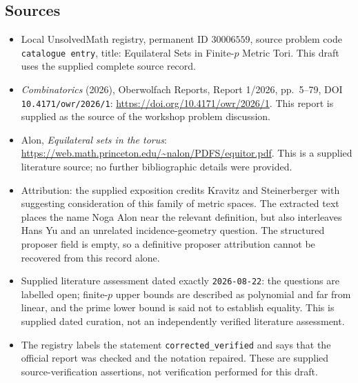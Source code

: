 \documentclass[11pt]{article}
\begin{document}
\subsection{Sources}
\begin{itemize}
\item Local UnsolvedMath registry, permanent ID \(30006559\), source problem code \texttt{catalogue entry}, title: Equilateral Sets in Finite-\(p\) Metric Tori. This draft uses the supplied complete source record.
\item \emph{Combinatorics} (2026), Oberwolfach Reports, Report 1/2026, pp.~5--79, DOI \texttt{10.4171/owr/2026/1}: \url{https://doi.org/10.4171/owr/2026/1}. This report is supplied as the source of the workshop problem discussion.
\item Alon, \emph{Equilateral sets in the torus}: \url{https://web.math.princeton.edu/~nalon/PDFS/equitor.pdf}. This is a supplied literature source; no further bibliographic details were provided.
\item Attribution: the supplied exposition credits Kravitz and Steinerberger with suggesting consideration of this family of metric spaces. The extracted text places the name Noga Alon near the relevant definition, but also interleaves Hans Yu and an unrelated incidence-geometry question. The structured proposer field is empty, so a definitive proposer attribution cannot be recovered from this record alone.
\item Supplied literature assessment dated exactly \texttt{2026-08-22}: the questions are labelled open; finite-\(p\) upper bounds are described as polynomial and far from linear, and the prime lower bound is said not to establish equality. This is supplied dated curation, not an independently verified literature assessment.
\item The registry labels the statement \texttt{corrected\_verified} and says that the official report was checked and the notation repaired. These are supplied source-verification assertions, not verification performed for this draft.
\end{itemize}
\end{document}
